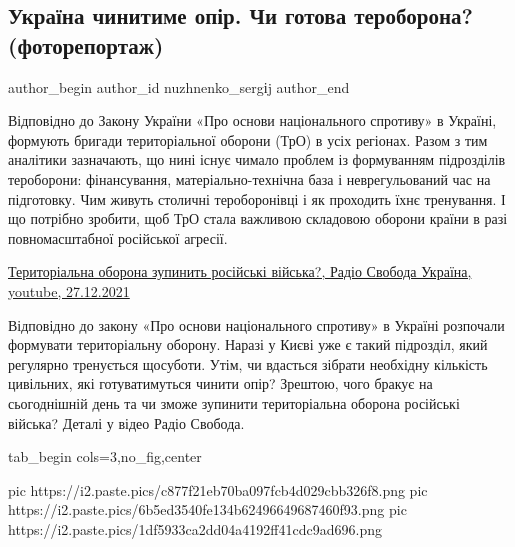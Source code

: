  
 
 
 
 
\subsection{Україна чинитиме опір. Чи готова тероборона? (фоторепортаж)}
\label{sec:29_12_2021.stz.news.ua.radiosvoboda.1.teroborona}

\ifcmt
 author_begin
   author_id nuzhnenko_sergіj
 author_end
\fi

Відповідно до Закону України «Про основи національного спротиву» в Україні,
формують бригади територіальної оборони (ТрО) в усіх регіонах. Разом з тим
аналітики зазначають, що нині існує чимало проблем із формуванням підрозділів
тероборони: фінансування, матеріально-технічна база і неврегульований час на
підготовку. Чим живуть столичні тероборонівці і як проходить їхнє тренування. І
що потрібно зробити, щоб ТрО стала важливою складовою оборони країни в разі
повномасштабної російської агресії.

\href{https://www.youtube.com/watch?v=JUxKN_znObA}{%
Територіальна оборона зупинить російські війська?, Радіо Свобода Україна, youtube, 27.12.2021%
}

Відповідно до закону «Про основи національного спротиву» в Україні розпочали
формувати територіальну оборону. Наразі у Києві уже є такий підрозділ, який
регулярно тренується щосуботи. Утім, чи вдасться зібрати необхідну кількість
цивільних, які готуватимуться чинити опір? Зрештою, чого бракує на сьогоднішній
день та чи зможе зупинити територіальна оборона російські війська? Деталі у
відео Радіо Свобода.


\ifcmt
  tab_begin cols=3,no_fig,center

     pic https://i2.paste.pics/c877f21eb70ba097fcb4d029cbb326f8.png
		 pic https://i2.paste.pics/6b5ed3540fe134b62496649687460f93.png
		 pic https://i2.paste.pics/1df5933ca2dd04a4192ff41cdc9ad696.png

